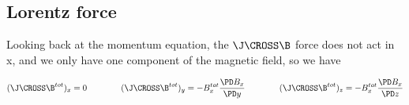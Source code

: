 \subsection{Lorentz force}

Looking back at the momentum equation, the $\J \CROSS \B$ force does not act in x, and we only have one component of the magnetic field, so we have

\begin{equation}
	(\J \CROSS \B^{tot})_x = 0
	\qquad \qquad
	(\J \CROSS \B^{tot})_y = - B_x^{tot} \frac{\PD B_x}{\PD y}
	\qquad \qquad
	(\J \CROSS \B^{tot})_z = - B_x^{tot} \frac{\PD B_x}{\PD z}
\end{equation}

